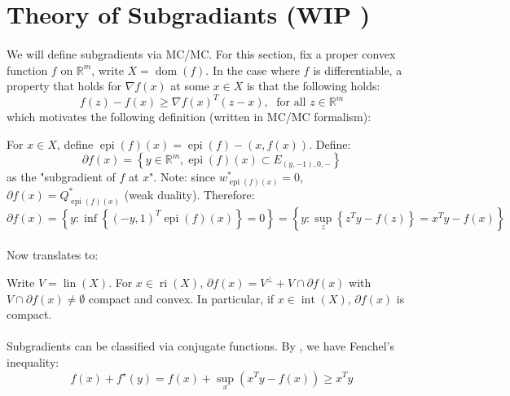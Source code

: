 \section{Theory of Subgradiants (WIP \faWrench)}
\label{sect:046}

\paragraph{}We will define subgradients via MC/MC. For this section, fix a proper convex function $f$ on $\mathbb{R}^m$, write $X=\operatorname{dom}(f)$. In the case where $f$ is differentiable, a property that holds for $\nabla f(x)$ at some $x\in X$ is that the following holds:
\[
	f(z)-f(x)\geq \nabla f(x)^T(z-x),\; \text{ for all }z\in \mathbb{R}^m
\]
which motivates the following definition (written in MC/MC formalism):

\begin{defn}[Subgradients]\label{defn-subgradients}
	For $x\in X$, define $\operatorname{epi}(f)(x) = \operatorname{epi}(f) - (x,f(x))$. Define:
	\[
		\partial f(x) = \left\{
		y\in \mathbb{R}^m,
		\operatorname{epi}(f)(x)\subset E_{(y,-1),0,-}
		\right\}
	\]
	as the "subgradient of $f$ at $x$". Note: since $w^\ast_{\operatorname{epi}(f)(x)}=0$, $\partial f(x)=Q^\ast_{\operatorname{epi}(f)(x)}$ (weak duality). Therefore:
	\[
		\partial f(x) = \left\{y:\inf\left\{(-y,1)^T \operatorname{epi}(f)(x)\right\}=0\right\}=\left\{y:\sup_z \left\{ z^Ty-f(z)\right\}=x^Ty-f(x)\right\}
	\]
\end{defn}

\paragraph{}Now  translates to:

\begin{prop}\label{prop:046-set-of-subgrad}
	Write $V=\operatorname{lin}(X)$. For $x\in \operatorname{ri}(X)$, $\partial f(x) = V^\perp + V\cap \partial f(x)$ with $V\cap \partial f(x)\neq\emptyset$ compact and convex. In particular, if $x\in \operatorname{int}(X)$, $\partial f(x)$ is compact.
\end{prop}

\paragraph{}Subgradients can be classified via conjugate functions. By , we have Fenchel's inequality:
\[
	f(x) + f^\star(y) = f(x) + \sup_{x}(x^Ty-f(x)) \geq x^Ty
\]

